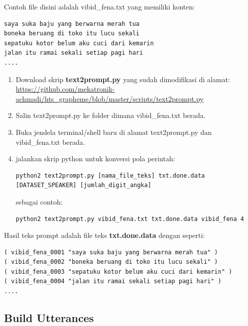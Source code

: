 \documentclass[12pt,]{article}
\begin{document}
	Contoh file disini adalah vibid\_fena.txt yang memiliki konten:
	\begin{verbatim}
saya suka baju yang berwarna merah tua
boneka beruang di toko itu lucu sekali
sepatuku kotor belum aku cuci dari kemarin
jalan itu ramai sekali setiap pagi hari
....
	\end{verbatim}

	\begin{enumerate}
		\item Download skrip \textbf{text2prompt.py} yang sudah dimodifikasi di alamat: \\
		\url{https://github.com/mekatronik-achmadi/hts_grapheme/blob/master/scripts/text2prompt.py}

		\item Salin text2prompt.py ke folder dimana vibid\_fena.txt berada.

		\item Buka jendela terminal/shell baru di alamat text2prompt.py dan vibid\_fena.txt berada.

		\item jalankan skrip python untuk konversi
		pola perintah:
		\begin{verbatim}
python2 text2prompt.py [nama_file_teks] txt.done.data [DATASET_SPEAKER] [jumlah_digit_angka]
		\end{verbatim}

		sebagai contoh:
		\begin{verbatim}
python2 text2prompt.py vibid_fena.txt txt.done.data vibid_fena 4
		\end{verbatim}

	\end{enumerate}

	Hasil teks prompt adalah file teks \textbf{txt.done.data} dengan seperti:
	\begin{verbatim}
( vibid_fena_0001 "saya suka baju yang berwarna merah tua" )
( vibid_fena_0002 "boneka beruang di toko itu lucu sekali" )
( vibid_fena_0003 "sepatuku kotor belum aku cuci dari kemarin" )
( vibid_fena_0004 "jalan itu ramai sekali setiap pagi hari" )
....
	\end{verbatim}

	\subsection{Build Utterances}
\end{document}
